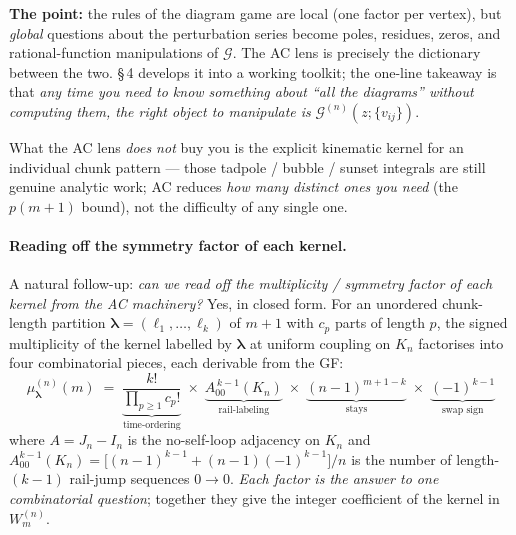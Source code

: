 \documentclass[11pt,a4paper]{article}
\begin{document}
\smallskip
\textbf{The point:} the rules of the diagram game are local (one factor
per vertex), but \emph{global} questions about the perturbation series
become poles, residues, zeros, and rational-function manipulations of
$\mathcal G$. The AC lens is precisely the dictionary between the two.
\S\,4 develops it into a working toolkit; the one-line takeaway is that
\emph{any time you need to know something about ``all the diagrams''
without computing them, the right object to manipulate is}
$\mathcal G^{(n)}(z;\{v_{ij}\})$.

\smallskip
What the AC lens \emph{does not} buy you is the explicit kinematic
kernel for an individual chunk pattern --- those tadpole / bubble /
sunset integrals are still genuine analytic work; AC reduces \emph{how
many distinct ones you need} (the $p(m{+}1)$ bound), not the difficulty
of any single one.

\paragraph{Reading off the symmetry factor of each kernel.}
A natural follow-up: \emph{can we read off the multiplicity / symmetry
factor of each kernel from the AC machinery?} Yes, in closed form. For
an unordered chunk-length partition
$\boldsymbol\lambda=(\ell_1,\dots,\ell_k)$ of $m{+}1$ with $c_p$ parts
of length $p$, the signed multiplicity of the kernel labelled by
$\boldsymbol\lambda$ at uniform coupling on $K_n$ factorises into four
combinatorial pieces, each derivable from the GF:
\begin{equation}\label{eq:multiplicity}
\boxed{\;
\mu_{\boldsymbol\lambda}^{(n)}(m)
\;=\;
\underbrace{\frac{k!}{\prod_{p\geq 1}c_p!}}_{\text{time-ordering}}
\;\times\;
\underbrace{A_{00}^{\,k-1}(K_n)}_{\text{rail-labeling}}
\;\times\;
\underbrace{(n-1)^{m+1-k}}_{\text{stays}}
\;\times\;
\underbrace{(-1)^{k-1}}_{\text{swap sign}}
\;}
\end{equation}
where $A=J_n-I_n$ is the no-self-loop adjacency on $K_n$ and
$A_{00}^{k-1}(K_n) = \big[(n-1)^{k-1}+(n-1)(-1)^{k-1}\big]/n$ is the
number of length-$(k{-}1)$ rail-jump sequences $0\!\to\!0$. \emph{Each
factor is the answer to one combinatorial question}; together they
give the integer coefficient of the kernel in $W^{(n)}_m$.
\end{document}
